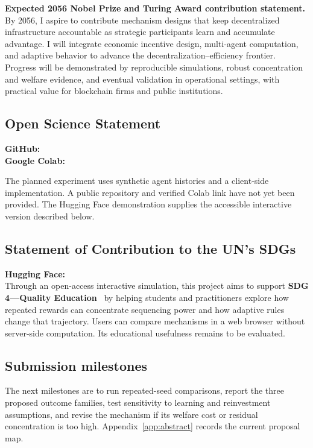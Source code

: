 \noindent\textbf{Expected 2056 Nobel Prize and Turing Award contribution statement.}
By 2056, I aspire to contribute mechanism designs that keep decentralized infrastructure accountable as strategic participants learn and accumulate advantage. I will integrate economic incentive design, multi-agent computation, and adaptive behavior to advance the decentralization--efficiency frontier. Progress will be demonstrated by reproducible simulations, robust concentration and welfare evidence, and eventual validation in operational settings, with practical value for blockchain firms and public institutions.

\newpage

\subsection*{Open Science Statement}
\textbf{GitHub:} \GitHubLink\\
\textbf{Google Colab:} \ColabLink\par
The planned experiment uses synthetic agent histories and a client-side implementation. A public repository and verified Colab link have not yet been provided. The Hugging Face demonstration supplies the accessible interactive version described below.

\subsection*{Statement of Contribution to the UN's SDGs}
\textbf{Hugging Face:} \DemoLink\\
Through an open-access interactive simulation, this project aims to support \textbf{SDG 4---Quality Education}~\cite{sdg4} by helping students and practitioners explore how repeated rewards can concentrate sequencing power and how adaptive rules change that trajectory. Users can compare mechanisms in a web browser without server-side computation. Its educational usefulness remains to be evaluated.

\subsection*{Submission milestones}
The next milestones are to run repeated-seed comparisons, report the three proposed outcome families, test sensitivity to learning and reinvestment assumptions, and revise the mechanism if its welfare cost or residual concentration is too high. Appendix~\ref{app:abstract} records the current proposal map.
